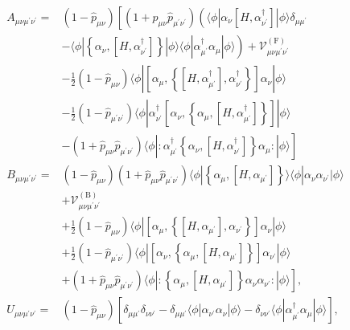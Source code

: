 \begin{equation}
\begin{split}
A_{\mu \nu \mu^{\prime} \nu^{\prime}}= & \left(1-\hat{p}_{\mu \nu}\right)\left[( 1 + \hat{p}_{\mu \nu} \hat{p}_{\mu^{\prime} \nu^{\prime}} ) \left(\langle\phi| \alpha_\nu\left[H, \alpha_{\nu^{\prime}}^{\dagger}\right]|\phi\rangle \delta_{\mu \mu^{\prime}}\right.\right. \\
& \left.-\langle\phi|\left\{\alpha_\nu,\left[H, \alpha_{\nu^{\prime}}^{\dagger}\right]\right\}|\phi\rangle\langle\phi| \alpha_{\mu^{\prime}}^{\dagger} \alpha_\mu|\phi\rangle\right)+\mathcal{V}_{\mu \nu \mu^{\prime} \nu^{\prime}}^{(\mathrm{F})} \\
& -\frac{1}{2}\left(1-\hat{p}_{\mu \nu}\right)\langle\phi|\left[\alpha_\mu,\left\{\left[H, \alpha_{\mu^{\prime}}^{\dagger}\right], \alpha_{\nu^{\prime}}^{\dagger}\right\}\right] \alpha_\nu|\phi\rangle \\
& -\frac{1}{2}\left(1-\hat{p}_{\mu^{\prime} \nu^{\prime}}\right)\langle\phi| \alpha_{\nu^{\prime}}^{\dagger}\left[\alpha_\nu,\left\{\alpha_\mu,\left[H, \alpha_{\mu^{\prime}}^{\dagger}\right]\right\}\right]|\phi\rangle \\
& \left.-\left(1+\hat{p}_{\mu \nu} \hat{p}_{\mu^{\prime} \nu^{\prime}}\right)\langle\phi|: \alpha_{\mu^{\prime}}^{\dagger}\left\{\alpha_\nu,\left[H, \alpha_{\nu^{\prime}}^{\dagger}\right]\right\} \alpha_\mu:|\phi\rangle\right] \\
B_{\mu \nu \mu^{\prime} \nu^{\prime}}= & \left(1-\hat{p}_{\mu \nu}\right)\left(1+\hat{p}_{\mu \nu} \hat{p}_{\mu^{\prime} \nu^{\prime}}\right)\langle\phi|\left\{\alpha_\mu,\left[H, \alpha_{\mu^{\prime}}\right]\right\}\rangle\langle\phi| \alpha_\nu \alpha_{\nu^{\prime}}|\phi\rangle \\
& +\mathcal{V}_{\mu \nu \mu^{\prime} \nu^{\prime}}^{(\mathrm{B})} \\
& +\frac{1}{2}\left(1-\hat{p}_{\mu \nu}\right)\langle\phi|\left[\alpha_\mu,\left\{\left[H, \alpha_{\mu^{\prime}}\right], \alpha_{\nu^{\prime}}\right\}\right] \alpha_\nu|\phi\rangle \\
& +\frac{1}{2}\left(1-\hat{p}_{\mu^{\prime} \nu^{\prime}}\right)\langle\phi|\left[\alpha_\nu,\left\{\alpha_\mu,\left[H, \alpha_{\mu^{\prime}}\right]\right\}\right] \alpha_{\nu^{\prime}}|\phi\rangle \\
& \left.+\left(1+\hat{p}_{\mu \nu} \hat{p}_{\mu^{\prime} \nu^{\prime}}\right)\langle\phi|:\left\{\alpha_\mu,\left[H, \alpha_{\mu^{\prime}}\right]\right\} \alpha_\nu \alpha_{\nu^{\prime}}:|\phi\rangle\right], \\
U_{\mu \nu \mu^{\prime} \nu^{\prime}}= & \left(1-\hat{p}_{\mu \nu}\right)\left[\delta_{\mu \mu^{\prime}} \delta_{\nu \nu^{\prime}}-\delta_{\mu \mu^{\prime}}\langle\phi| \alpha_{\nu^{\prime}} \alpha_\nu|\phi\rangle-\delta_{\nu \nu^{\prime}}\langle\phi| \alpha_{\mu^{\prime}}^{\dagger} \alpha_\mu|\phi\rangle\right],
\end{split}
\end{equation}
